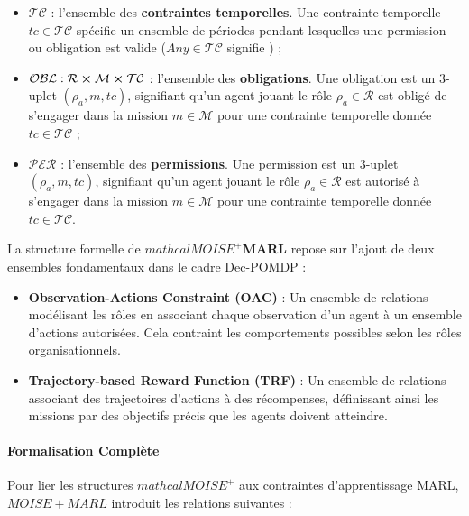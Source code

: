\documentclass[sigconf,anonymous]{aamas}
\begin{document}
\begin{itemize}
    \item $\mathcal{TC}$ : l'ensemble des \textbf{contraintes temporelles}. Une contrainte temporelle $tc \in \mathcal{TC}$ spécifie un ensemble de périodes pendant lesquelles une permission ou obligation est valide ($Any \in \mathcal{TC}$ signifie ) ;
    \item $\mathcal{OBL} : \mathcal{R} \cross \mathcal{M} \cross \mathcal{TC}$ : l'ensemble des \textbf{obligations}. Une obligation est un 3-uplet $(\rho_a, m, tc)$, signifiant qu'un agent jouant le rôle $\rho_a \in \mathcal{R}$ est obligé de s'engager dans la mission $m \in \mathcal{M}$ pour une contrainte temporelle donnée $tc \in \mathcal{TC}$ ;
    \item $\mathcal{PER}$ : l'ensemble des \textbf{permissions}. Une permission est un 3-uplet $(\rho_a, m, tc)$, signifiant qu'un agent jouant le rôle $\rho_a \in \mathcal{R}$ est autorisé à s'engager dans la mission $m \in \mathcal{M}$ pour une contrainte temporelle donnée $tc \in \mathcal{TC}$.
\end{itemize}

La structure formelle de \textbf{$mathcal{M}OISE^+$MARL} repose sur l'ajout de deux ensembles fondamentaux dans le cadre Dec-POMDP : 

\begin{itemize}
    \item \textbf{Observation-Actions Constraint (OAC)} : Un ensemble de relations modélisant les rôles en associant chaque observation d'un agent à un ensemble d'actions autorisées. Cela contraint les comportements possibles selon les rôles organisationnels.
    \item \textbf{Trajectory-based Reward Function (TRF)} : Un ensemble de relations associant des trajectoires d'actions à des récompenses, définissant ainsi les missions par des objectifs précis que les agents doivent atteindre.
\end{itemize}

\paragraph{Formalisation Complète}

Pour lier les structures $mathcal{M}OISE^+$ aux contraintes d'apprentissage MARL, $MOISE+MARL$ introduit les relations suivantes :
\end{document}
